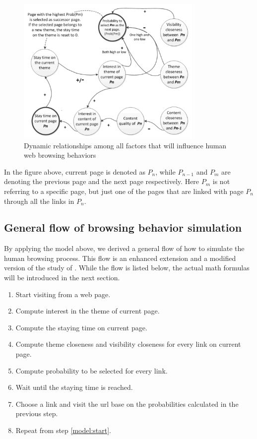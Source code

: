 \documentclass[12pt]{report}
\begin{document}
\begin{figure}[h!]
  \centering
  \includegraphics[width=0.8\textwidth]{./pictures/model}
  \caption{Dynamic relationships among all factors that will influence human web browsing behaviors}
\end{figure}

In the figure above, current page is denoted as \(P_n\), while \(P_{n-1}\) and \(P_m\) are denoting the previous page and the next page respectively. Here \(P_m\) is not referring to a specific page, but just one of the pages that are linked with page \(P_n\) through all the links in \(P_n\).


\subsection{General flow of browsing behavior simulation}
By applying the model above, we derived a general flow of how to simulate the human browsing process. This flow is an enhanced extension and a modified version of the study of \citet{yang}. While the flow is listed below, the actual math formulas will be introduced in the next section.

\begin{enumerate}
\item Start visiting from a web page.
\item \label{model:start} Compute interest in the theme of current page.
\item Compute the staying time on current page.
\item Compute theme closeness and visibility closeness for every link on current page.
\item Compute probability to be selected for every link.
\item Wait until the staying time is reached.
\item Choose a link and visit the url base on the probabilities calculated in the previous step.
\item Repeat from step \ref{model:start}.
\end{enumerate}
\end{document}
